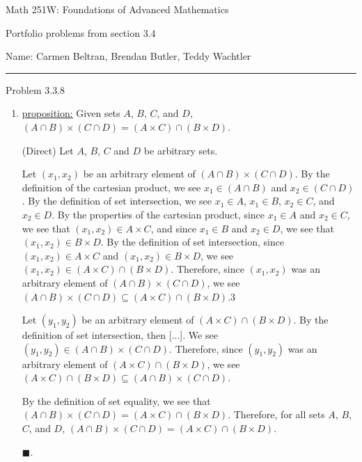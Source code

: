 \documentclass{article}
\theoremstyle{definition}
\renewcommand{\qed}{\blacksquare}
\begin{document}
\begin{center}
\Large{Math 251W: Foundations of Advanced Mathematics}

\normalsize Portfolio problems from section 3.4

\hfill Name: Carmen Beltran, Brendan Butler, Teddy Wachtler
\hrule
\vspace{0.4cm}
\vspace{0.75cm}
\end{center}


\noindent Problem 3.3.8
\vspace{0.3cm}

\begin{enumerate}
\item[v]
\underline{proposition:}
Given sets $A$, $B$, $C$, and $D$, $(A \cap B) \times (C \cap D) = (A \times C) \cap (B \times D)$.

\vspace{.2cm}

 (Direct)
Let $A$, $B$, $C$ and $D$ be arbitrary sets.

Let $(x_1, x_2)$ be an arbitrary element of $(A \cap B) \times (C \cap D)$.
By the definition of the cartesian product, we see $x_1 \in (A \cap B)$ and $x_2 \in (C \cap D)$.
By the definition of set intersection, we see $x_1 \in A$, $x_1 \in B$, $x_2 \in C$, and $x_2 \in D$.
By the properties of the cartesian product, since $x_1 \in A$ and $x_2 \in C$, we see that $(x_1, x_2) \in A \times C$, and since $x_1 \in B$ and $x_2 \in D$, we see that $(x_1, x_2) \in B \times D$.
By the definition of set intersection, since $(x_1, x_2) \in A \times C$ and $(x_1, x_2) \in B \times D$, we see $(x_1, x_2) \in (A \times C) \cap (B \times D)$.
Therefore, since $(x_1, x_2)$ was an arbitrary element of $(A \cap B) \times (C \cap D)$, we see $(A \cap B) \times (C \cap D) \subseteq (A \times C) \cap (B \times D)$.3

Let $(y_1, y_2)$ be an arbitrary element of $(A \times C) \cap (B \times D)$.
By the definition of set intersection, then [...].
We see $(y_1, y_2) \in (A \cap B) \times (C \cap D)$.
Therefore, since $(y_1, y_2)$ was an arbitrary element of $(A \times C) \cap (B \times D)$, we see $(A \times C) \cap (B \times D) \subseteq (A \cap B) \times (C \cap D)$.

By the definition of set equality, we see that $(A \cap B) \times (C \cap D) = (A \times C) \cap (B \times D)$.
Therefore, for all sets $A$, $B$, $C$, and $D$, $(A \cap B) \times (C \cap D) = (A \times C) \cap (B \times D)$.

$\qed$.

\vspace{.2cm}
\end{enumerate}
\vspace{1cm}
\end{document}
